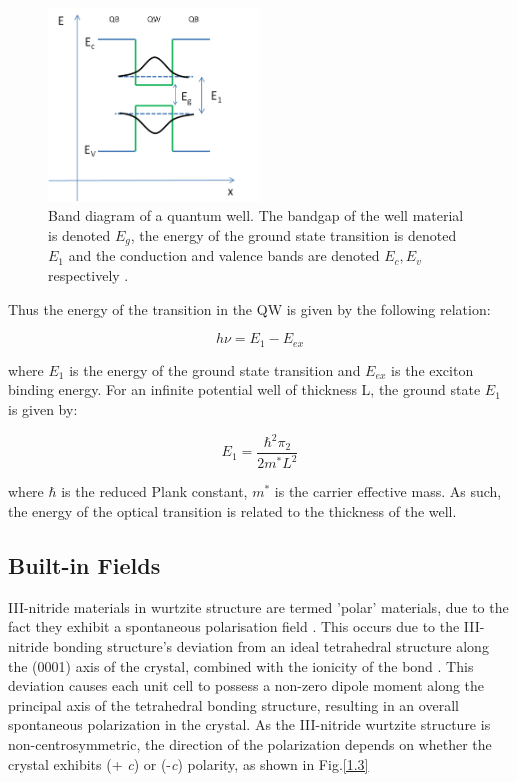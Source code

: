 \begin{figure}[h]
	\centering
	\includegraphics[width=0.5\textwidth, trim = 4 4 4 4 , clip]{Figs/Ch1/BandstructureQW.png}
	\caption {Band diagram of a quantum well. The bandgap of the well material is denoted $E_{g}$, the energy of the ground state transition is denoted $E_{1}$ and the conduction and valence bands are denoted $E_{c},E_{v}$ respectively \cite{Ren2015}.}
	\label{QW}
\end{figure}
\FloatBarrier

Thus the energy of the transition in the QW is given by the following relation:

\begin{equation}
h\nu = E_{1}-E_{ex}
\end{equation}

where $E_{1}$ is the energy of the ground state transition and $E_{ex}$ is the exciton binding energy. For an infinite potential well of thickness L, the ground state $E_{1}$ is given by:

\begin{equation}
E_{1}=\frac{\hbar^{2}\pi_{2}}{2m^{*}L^{2}}
\end{equation}

where $\hbar$ is the reduced Plank constant, $m^{*}$ is the carrier effective mass. As such, the energy of the optical transition is related to the thickness of the well.

\subsection{Built-in Fields} 
\label{section1.1.3}
III-nitride materials in wurtzite structure are termed 'polar' materials, due to the fact they exhibit a spontaneous polarisation field \cite{Ambacher2002}. This occurs due to the III-nitride bonding structure's deviation from an ideal tetrahedral structure along the (0001) axis of the crystal, combined with the ionicity of the bond \cite{Ren2015}. This deviation causes each unit cell to possess a non-zero dipole moment along the principal axis of the tetrahedral bonding structure, resulting in an overall spontaneous polarization in the crystal. As the III-nitride wurtzite structure is non-centrosymmetric, the direction of the polarization depends on whether the crystal exhibits (+ {\it c}) or (-{\it c}) polarity, as shown in Fig.\ref{1.3}

